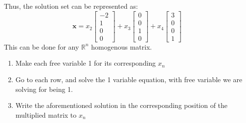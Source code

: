 \documentclass[nobib]{tufte-handout}
\begin{document}
Thus, the solution set can be represented as:
\begin{equation*}
    \mathbf{x}=
    x_2
    \begin{bmatrix}
        -2\\ 1 \\ 0 \\ 0
    \end{bmatrix} +x_3
    \begin{bmatrix}
        0\\ 0 \\ 1 \\ 0
    \end{bmatrix} + x_4
    \begin{bmatrix}
        3\\ 0 \\ 0 \\ 1
    \end{bmatrix}
\end{equation*}
This can be done for any $\mathbb{R}^n$ homogenous matrix. 
\begin{enumerate}
    \item Make each free variable 1 for its corresponding $x_n$
    \item Go to each row, and solve the 1 variable equation, with free variable we are solving for being 1.
    \item Write the aforementioned solution in the corresponding position of the multiplied matrix to $x_n$ 
\end{enumerate}
\end{document}
